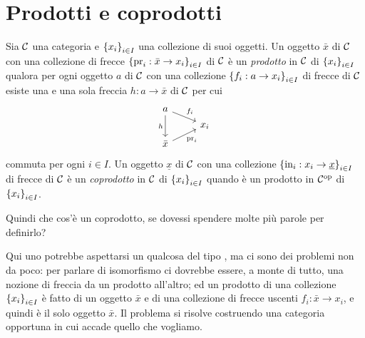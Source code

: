 
\section{Prodotti e coprodotti}

\begin{definizione}
Sia \(\mathcal C\) una categoria e \(\left\{x_i\right\}_{i \in I}\) una collezione di suoi oggetti. Un oggetto \(\bar x\) di \(\mathcal C\) con una collezione di frecce \(\left\{\text{pr}_i : \bar x \to x_i\right\}_{i \in I}\) di \(\mathcal C\) è un {\em prodotto} in \(\mathcal C\) di \(\left\{x_i\right\}_{i \in I}\) qualora per ogni oggetto \(a\) di \(\mathcal C\) con una collezione \(\left\{f_i : a \to x_i\right\}_{i \in I}\) di frecce di \(\mathcal C\) esiste una e una sola freccia \(h : a \to \bar x\) di \(\mathcal C\) per cui
\[\begin{tikzcd}[row sep=tiny]
a \ar["{f_i}", dr] \ar["h",dd, swap] &    \\
                                    & x_i \\
\bar x \ar["{\prj_i}", ur, swap]       &
\end{tikzcd}\]
commuta per ogni \(i \in I\). Un oggetto \(\underline x\) di \(\mathcal C\) con una collezione \(\left\{\text{in}_i : x_i \to \underline x\right\}_{i \in I}\) di frecce di \(\mathcal C\) è un {\em coprodotto} in \(\mathcal C\) di \(\left\{x_i\right\}_{i \in I}\) quando è un prodotto in \(\mathcal C^\text{op}\) di \(\left\{x_i\right\}_{i \in I}\).
\end{definizione}

\begin{esercizio}
Quindi che cos'è un coprodotto, se dovessi spendere molte più parole per definirlo?
\end{esercizio}

Qui uno potrebbe aspettarsi un qualcosa del tipo , ma ci sono dei problemi non da poco: per parlare di isomorfismo ci dovrebbe essere, a monte di tutto, una nozione di freccia da un prodotto all'altro; ed un prodotto di una collezione \(\left\{x_i\right\}_{i \in I}\) è fatto di un oggetto \(\bar x\) e di una collezione di frecce uscenti \(f_i : \bar x \to x_i\), e quindi è il solo oggetto \(\bar x\). Il problema si risolve costruendo una categoria opportuna in cui accade quello che vogliamo.

